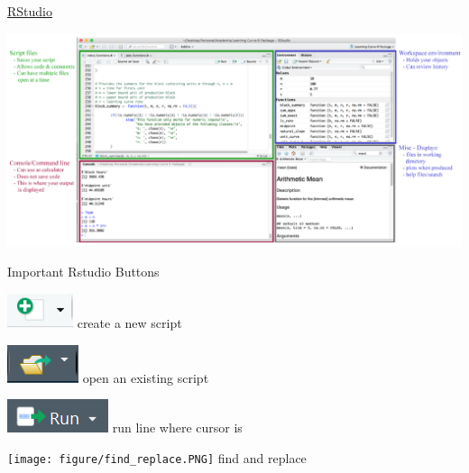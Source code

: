 \documentclass[
  10pt,
  ignorenonframetext,
]{beamer}
\begin{document}
\begin{frame}{\href{http://uc-r.github.io/introduction}{RStudio}}
\protect\hypertarget{rstudio}{}

\includegraphics[width=1.1\textwidth,height=\textheight]{figure/rstudio_ide.PNG}

\end{frame}

\begin{frame}{Important Rstudio Buttons}
\protect\hypertarget{important-rstudio-buttons}{}

\includegraphics{figure/new_script.PNG} create a new script

\includegraphics{figure/Skriptoeffnen.PNG} open an existing script

\includegraphics{figure/runskript.PNG} run line where cursor is

\texttt{[image: figure/find\_replace.PNG]} find and replace

\end{frame}
\end{document}
